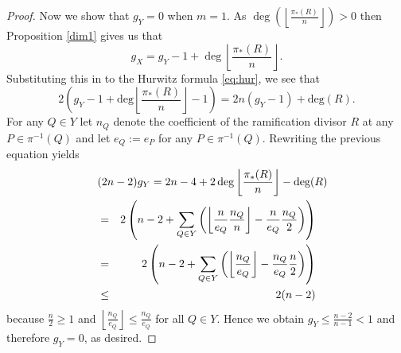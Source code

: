 \documentclass[11pt]{article} %
\begin{document}
\begin{proof}
    Now we show that $g_Y=0$ when $m=1$. 
    As $\deg\left( \left\lfloor \frac{\pi_*(R)}{n} \right\rfloor \right) >0$ then Proposition \ref{dim1} gives us that
      \begin{equation*}
	g_X=g_Y-1+\deg\left\lfloor \frac{\pi_*(R)}{n} \right\rfloor.
      \end{equation*}
    Substituting this in to the Hurwitz formula \eqref{eq:hur}, we see that
      \begin{equation*}
	2\left(g_Y - 1 + \textrm{deg}\left \lfloor \frac{\pi_*(R)}{n} \right \rfloor -1 \right) = 2n (g_Y -1) + \textrm{deg}(R).
      \end{equation*}
    For any $Q \in Y$ let $n_Q$ denote the coefficient of the ramification divisor $R$ at any $P \in \pi^{-1}(Q)$ and let $e_Q := e_P$ for any $P \in \pi^{-1}(Q)$. 
    Rewriting the previous equation yields
      \begin{eqnarray*}
	\lefteqn{(2n-2)g_Y = 2n-4 + 2 \,\textrm{deg}\left \lfloor \frac{\pi_*(R)}{n}\right \rfloor - \textrm{deg}(R)}\\
	&=& 2 \left(n-2 + \sum_{Q \in Y} \left(\left\lfloor \frac{n}{e_Q} \frac{n_Q}{n} \right\rfloor - \frac{n}{e_Q} \frac{n_Q}{2}\right) \right)\\
	&=& 2 \left(n-2 + \sum_{Q \in Y} \left( \left\lfloor \frac{n_Q}{e_Q} \right\rfloor - \frac{n_Q}{e_Q} \frac{n}{2} \right)\right)\\
	& \le & 2(n-2)
      \end{eqnarray*}
    because $\frac{n}{2} \ge 1$ and $\left\lfloor \frac{n_Q}{e_Q}\right\rfloor \le \frac{n_Q}{e_Q}$ for all $Q \in Y$. 
    Hence we obtain $g_Y \le \frac{n-2}{n-1} < 1$ and therefore $g_Y =0$, as desired.


\end{proof}
\end{document}
